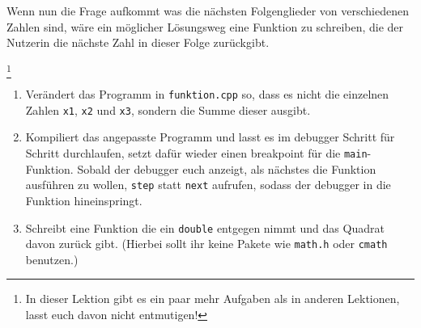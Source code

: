 Wenn nun die Frage aufkommt was die nächsten Folgenglieder von verschiedenen Zahlen sind, wäre ein möglicher Lösungsweg eine Funktion zu schreiben, die der Nutzerin die nächste Zahl in dieser Folge zurückgibt.


\begin{praxis}\footnote{In dieser Lektion gibt es ein paar mehr Aufgaben als in anderen Lektionen, lasst euch davon nicht entmutigen!}
	\begin{enumerate}
		\item Verändert das Programm in \texttt{funktion.cpp} so, dass es nicht die einzelnen Zahlen \texttt{x1}, \texttt{x2} und \texttt{x3}, sondern die Summe dieser ausgibt.
		\item Kompiliert das angepasste Programm und lasst es im debugger Schritt für Schritt durchlaufen, setzt dafür wieder einen breakpoint für die \texttt{main}-Funktion.
		      Sobald der debugger euch anzeigt, als nächstes die Funktion ausführen zu wollen, \texttt{step} statt \texttt{next} aufrufen, sodass der debugger in die Funktion hineinspringt.
		\item Schreibt eine Funktion die ein \texttt{double} entgegen nimmt und das Quadrat davon zurück gibt.
		      (Hierbei sollt ihr keine Pakete wie \texttt{math.h} oder \texttt{cmath} benutzen.)
	\end{enumerate}
\end{praxis}

